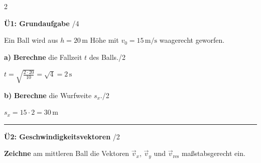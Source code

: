 \documentclass[10pt, a4paper]{article}
\newcommand{\fachfarbe}{physik}
\newcommand{\punkte}[1]{\hfill\small\textcolor{grau}{/#1}}
\newcommand{\lsg}[1]{\textcolor{loesung}{\textbf{#1}}}
\newcommand{\abschnitt}[1]{%
    \vspace{4pt}
    \noindent\textbf{\textcolor{\fachfarbe}{#1}}
    \vspace{2pt}
}
\begin{document}
\begin{multicols}{2}

\columnbreak


\abschnitt{Ü1: Grundaufgabe}\punkte{4}

Ein Ball wird aus $h = 20\,\text{m}$ Höhe mit $v_0 = 15\,\text{m/s}$ waagerecht geworfen.

\textbf{a)} \textbf{Berechne} die Fallzeit $t$ des Balls.\hfill\textcolor{grau}{\small/2}

\lsg{$t = \sqrt{\frac{2 \cdot 20}{10}} = \sqrt{4} = 2\,\text{s}$}

\vspace{0.4cm}

\textbf{b)} \textbf{Berechne} die Wurfweite $s_x$.\hfill\textcolor{grau}{\small/2}

\lsg{$s_x = 15 \cdot 2 = 30\,\text{m}$}

\vspace{0.4cm}

\hrule
\vspace{4pt}


\abschnitt{Ü2: Geschwindigkeitsvektoren}\punkte{2}

\textbf{Zeichne} am mittleren Ball die Vektoren $\vec{v}_x$, $\vec{v}_y$ und $\vec{v}_{\text{res}}$ maßstabsgerecht ein.

\begin{center}
\end{center}
\end{multicols}
\end{document}

